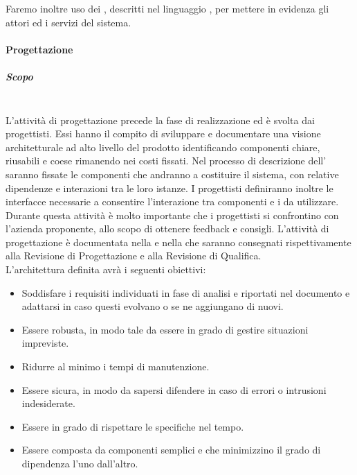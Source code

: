    Faremo inoltre uso dei  , descritti nel linguaggio , per mettere in evidenza gli attori ed i servizi del sistema. 
    
    
    
    

\paragraph{Progettazione}
    \subparagraph{Scopo}
    ~\\
    L'attività di progettazione precede la fase di realizzazione ed è svolta dai progettisti. Essi hanno il compito di sviluppare e documentare una visione architetturale ad alto livello del prodotto identificando componenti chiare, riusabili e coese rimanendo nei costi fissati. Nel processo di descrizione dell'  saranno fissate le componenti che andranno a costituire il sistema, con relative dipendenze e interazioni tra le loro istanze. I progettisti definiranno inoltre le interfacce necessarie a consentire l'interazione tra componenti e i  da utilizzare.\\
    Durante questa attività è molto importante che i progettisti si confrontino con l’azienda proponente, allo scopo di ottenere feedback e consigli. L’attività di progettazione è documentata nella
     e nella  che saranno consegnati rispettivamente alla Revisione di Progettazione e alla Revisione di Qualifica.\\
    L’architettura definita avrà i seguenti obiettivi:
        \begin{itemize}
            \item Soddisfare i requisiti individuati in fase di analisi e riportati nel documento \AdR e adattarsi in caso questi evolvano o se ne aggiungano di nuovi.
            \item Essere robusta, in modo tale da essere in grado di gestire situazioni impreviste.
            \item Ridurre al minimo i tempi di manutenzione.
            \item Essere sicura, in modo da sapersi difendere in caso di errori o intrusioni indesiderate.
            \item Essere in grado di rispettare le specifiche nel tempo.
            \item Essere composta da componenti semplici e che minimizzino il grado di dipendenza l'uno dall'altro.
        \end{itemize}
    
